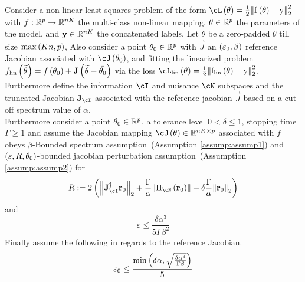 \documentclass[a4paper]{article}
\let\temp\epsilon
\let\epsilon\varepsilon
\let\varepsilon\temp
\begin{document}
\begin{thm}\label{thm:meta-thm1}
  Consider a non-linear least squares problem of the form
  $\cL\br{\theta} = \frac{1}{2}\norm{f\br{\theta} - y}_2^2$ with
  $f:\mathbb{R}^p\rightarrow\mathbb{R}^{nK}$ the multi-class non-linear
  mapping, $\theta\in\mathbb{R}^p$ the parameters of the model, and
  ${\mathbf{y}}\in\mathbb{R}^{nK}$ the concatenated labels. Let $\bar{\theta}$ be a zero-padded $\theta$ till
  size $\mathrm{max}\left({Kn,p}\right)$, Also consider a point
  $\theta_0\in\mathbb{R}^p$ with $\vec{J}$ an $\br{\epsilon_0,\beta}$
  reference Jacobian associated with $\cJ\br{\theta_0}$, and fitting the linearized problem
  $f_{\mathrm{lin}}\left({\widetilde{\theta}}\right) = f\left({\theta_0}\right) +
  {\mathbf{J}}\left({\widetilde{\theta} - \bar{\theta_0}}\right)$ via the loss
  $\cL_{\mathrm{lin}}\br{\theta} =
  \frac{1}{2}\norm{f_{\mathrm{lin}}\br{\theta} - y}_2^2$.\\
  
  Furthermore define the information $\cI$ and nuisance $\cN$
  subspaces and the truncated Jacobian $\vec{J}_{\cI}$ associated with
  the reference jacobian $\vec{J}$ based on a cut-off spectrum value
  of $\alpha$.\\

  Furthermore consider a point $\theta_0\in\mathbb{R}^p$, a tolerance
  level $0<\delta\le 1$, stopping time $\Gamma\ge 1$ and assume the
  Jacobian mapping $\cJ\br{\theta}\in\reals^{nK\times p}$ associated
  with $f$ obeys $\beta$-Bounded spectrum assumption~(Assumption \ref{assump:assump1})
  and $\br{\epsilon,R,\theta_0}$-bounded jacobian perturbation
  assumption~(Assumption \ref{assump:assump2}) for 
  \begin{equation}
    \label{eq:theta_diam}
    R := 2\br{\norm{\vec{J}_\cI^\dagger
        \vec{r}_0}_2 +
      \frac{\Gamma}{\alpha}\norm{\Pi_\cN\br{\vec{r}_0}} + \delta\frac{\Gamma}{\alpha}\norm{\vec{r}_0}_2}
  \end{equation}
  and
  \begin{equation}
    \label{eq:epsilon_upper}
    \epsilon\le \dfrac{\delta\alpha^3}{5\Gamma\beta^2}
  \end{equation}
 Finally assume the following in regards to the reference Jacobian.
   \begin{equation}
    \label{eq:epsilon_zero_upper}
    \epsilon_0\le \dfrac{\min\br{\delta\alpha, \sqrt{\frac{\delta\alpha^3}{\Gamma\beta}}}}{5}
  \end{equation}
  

\end{thm}
\end{document}

